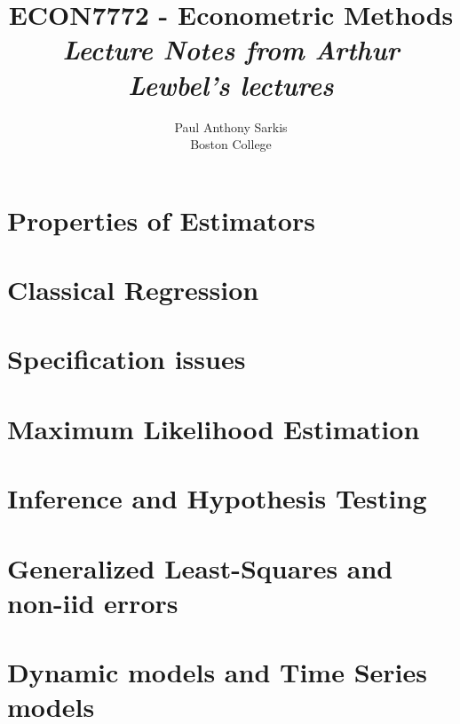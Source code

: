 \documentclass[12pt]{report} %
\begin{document}
\date{}
\title{\textbf{\huge{ECON7772 - Econometric Methods}}\\ \textit{Lecture Notes from Arthur Lewbel's lectures}}
\author{Paul Anthony Sarkis\\ Boston College} 
 
\maketitle

\tableofcontents

\chapter{Properties of Estimators}



\chapter{Classical Regression}



\chapter{Specification issues}



\chapter{Maximum Likelihood Estimation}



\chapter{Inference and Hypothesis Testing}



\chapter{Generalized Least-Squares and non-iid errors}



\chapter{Dynamic models and Time Series models}
\end{document}
